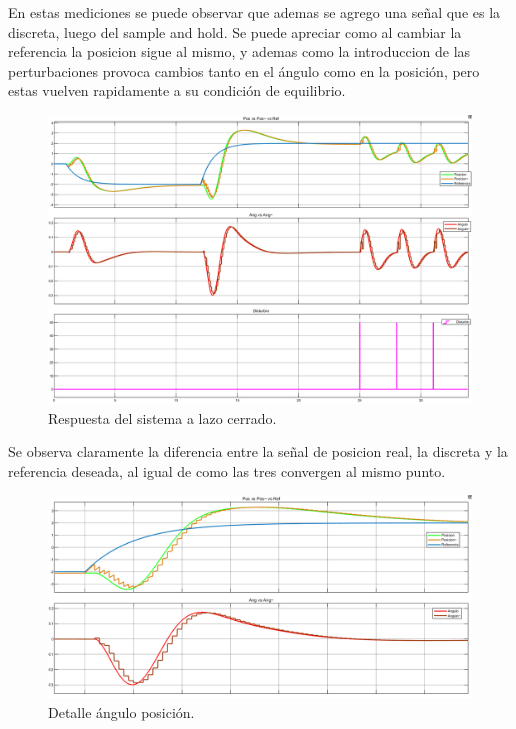 En estas mediciones se puede observar que ademas se agrego una señal que es la discreta, luego del sample and hold.
Se puede apreciar como al cambiar la referencia la posicion sigue al mismo, y ademas como la introduccion de las perturbaciones provoca cambios tanto en el ángulo como en la posición, pero estas vuelven rapidamente a su condición de equilibrio. 
\begin{figure}[H]
	\centering
	\includegraphics[width=1\linewidth]{Imagenes/Control_Obs_Discreto/general.png}
	\caption{Respuesta del sistema a lazo cerrado.}
	\label{realmentacion}
\end{figure}

Se observa claramente la diferencia entre la señal de posicion real, la discreta y la referencia deseada, al igual de como las tres convergen al mismo punto.
\begin{figure}[H]
	\centering
	\includegraphics[width=1\linewidth]{Imagenes/Control_Obs_Discreto/detalle_angulo_pos.png}
	\caption{Detalle \'angulo posición.}
	\label{realmentacion_error}
\end{figure}


